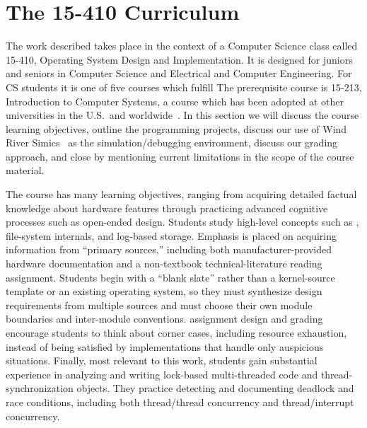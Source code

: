 \section{The 15-410 Curriculum}
\label{sec:curriculum}

The work described takes place in the context of a
Computer Science class called
15-410, Operating System Design and Implementation.
It is designed for juniors and seniors in Computer Science
and Electrical and Computer Engineering.
For CS students it is one of five courses which fulfill
The prerequisite course is 15-213,
Introduction to Computer Systems,
a course which has been adopted at other
universities in the U.S.\ and worldwide~\cite{sigcse01:CSaPP}.
In this section we will discuss the course learning
objectives,
outline the programming projects,
discuss our use of Wind River Simics~\cite{simics} as
the simulation/debugging environment,
discuss our grading approach,
and close by mentioning current limitations in the scope
of the course material.

The course has many learning objectives,
ranging from acquiring detailed factual knowledge about
hardware features
through practicing advanced cognitive processes
such as open-ended design.
%
Students study high-level concepts
such as
,
file-system internals,
and log-based storage.
%
Emphasis is placed on acquiring information from ``primary sources,''
including both manufacturer-provided hardware documentation
and a non-textbook technical-literature reading assignment.
%
Students begin with a ``blank slate'' rather than a
kernel-source template or an existing operating system,
so they must synthesize design requirements from multiple sources
and must
choose their own module boundaries and inter-module conventions.
%
assignment design and grading encourage students to
think about corner cases, including resource exhaustion,
instead of being satisfied by
implementations that handle only auspicious situations.
%
Finally, most relevant to this work,
students gain substantial experience in
analyzing and writing lock-based multi-threaded code and
thread-synchronization objects.
They practice detecting and documenting deadlock and race conditions,
including both thread/thread concurrency and thread/interrupt concurrency.

